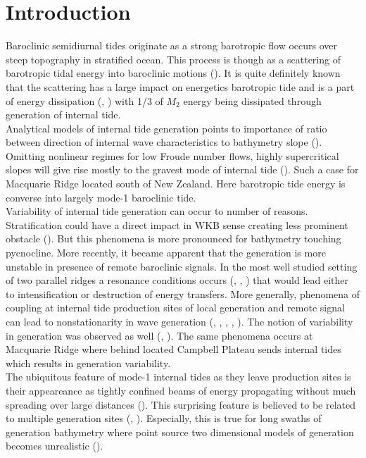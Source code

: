 \section{Introduction}
Baroclinic semidiurnal tides originate as a strong barotropic flow occurs over steep topography in stratified ocean. This process is though as a scattering of barotropic tidal energy into baroclinic motions (\cite{ROG:ROG324}). It is quite definitely known that the scattering has a large impact on energetics barotropic tide and is a part of energy dissipation (\cite{egbert2000significant}, \cite{munk1997once}) with 1/3 of $M_2$ energy being dissipated through generation of internal tide.\\
Analytical models of internal tide generation points to importance of ratio between direction of internal wave characteristics to bathymetry slope (\cite{garrett2007internal}). Omitting nonlinear regimes for low Froude number flows, highly supercritical slopes will give rise mostly to the gravest mode of internal tide (\cite{echeverri2010internal}). Such a case for Macquarie Ridge located south of New Zealand. Here barotropic tide energy is converse into largely mode-1 baroclinic tide.\\
Variability of internal tide generation can occur to number of reasons. Stratification could have a direct impact in WKB sense creating less prominent obstacle (\cite{holloway1999internal}). But this phenomena is more pronounced for bathymetry touching pycnocline. More recently, it became apparent that the generation is more unstable in presence of remote baroclinic signals. In the most well studied setting of two parallel ridges a resonance conditions occurs (\cite{echeverri2010internal}, \cite{buijsman2012double}, \cite{buijsman2014three}) that would lead either to intensification or destruction of energy transfers. More generally, phenomena of coupling at internal tide production sites of local generation and remote signal can lead to nonstationarity in wave generation (\cite{Kelly2010a}, \cite{osborne2011spatial}, \cite{kerry2013effects}, \cite{xing1998three}, \cite{buijsman2012modeling}). The notion of variability in generation was observed as well (\cite{pickering2015structure}, \cite{zilberman2011incoherent}). The same phenomena occurs at Macquarie Ridge where behind located Campbell Plateau sends internal tides which results in generation variability.\\
The ubiquitous feature of mode-1 internal tides as they leave production sites is their appeareance as tightly confined beams of energy propagating without much spreading over large distances (\cite{zhao2016global}). This surprising feature is believed to be related to multiple generation sites (\cite{rainville2010interference}, \cite{terker2014observations}). Especially, this is true for long swaths of generation bathymetry where point source two dimensional models of generation becomes unrealistic (\cite{munroe2005topographic}).\\
